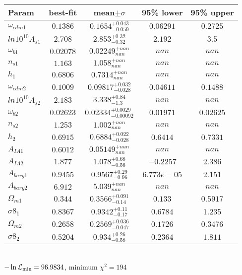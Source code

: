 \begin{tabular}{|l|c|c|c|c|} 
 \hline 
Param & best-fit & mean$\pm\sigma$ & 95\% lower & 95\% upper \\ \hline 
$\omega_{cdm 1 }$ &$0.1386$ & $0.1654_{-0.059}^{+0.043}$ & $0.06291$ & $0.2725$ \\ 
$ln10^{10}A_{s 1 }$ &$2.708$ & $2.853_{-0.32}^{+0.32}$ & $2.192$ & $3.5$ \\ 
$\omega_{b 1 }$ &$0.02078$ & $0.02249_{nan}^{+nan}$ & $nan$ & $nan$ \\ 
$n_{s 1 }$ &$1.163$ & $1.058_{nan}^{+nan}$ & $nan$ & $nan$ \\ 
$h_{1 }$ &$0.6806$ & $0.7314_{nan}^{+nan}$ & $nan$ & $nan$ \\ 
$\omega_{cdm 2 }$ &$0.1009$ & $0.09817_{-0.028}^{+0.032}$ & $0.04611$ & $0.1488$ \\ 
$ln10^{10}A_{s 2 }$ &$2.183$ & $3.338_{-1.3}^{+0.84}$ & $nan$ & $nan$ \\ 
$\omega_{b 2 }$ &$0.02623$ & $0.02334_{-0.00092}^{+0.0029}$ & $0.01971$ & $0.02625$ \\ 
$n_{s 2 }$ &$1.253$ & $1.002_{nan}^{+nan}$ & $nan$ & $nan$ \\ 
$h_{2 }$ &$0.6915$ & $0.6884_{-0.028}^{+0.022}$ & $0.6414$ & $0.7331$ \\ 
$A_{IA 1 }$ &$0.6012$ & $0.05149_{nan}^{+nan}$ & $nan$ & $nan$ \\ 
$A_{IA 2 }$ &$1.877$ & $1.078_{-0.56}^{+0.68}$ & $-0.2257$ & $2.386$ \\ 
$A_{bary 1 }$ &$0.9455$ & $0.9567_{-0.96}^{+0.29}$ & $6.773e-05$ & $2.151$ \\ 
$A_{bary 2 }$ &$6.912$ & $5.039_{nan}^{+nan}$ & $nan$ & $nan$ \\ 
$\Omega_{m 1 }$ &$0.344$ & $0.3566_{-0.14}^{+0.091}$ & $0.133$ & $0.5917$ \\ 
$\sigma8_{1 }$ &$0.8367$ & $0.9342_{-0.17}^{+0.11}$ & $0.6784$ & $1.235$ \\ 
$\Omega_{m 2 }$ &$0.2658$ & $0.2569_{-0.047}^{+0.036}$ & $0.1726$ & $0.3476$ \\ 
$\sigma8_{2 }$ &$0.5204$ & $0.934_{-0.58}^{+0.26}$ & $0.2364$ & $1.811$ \\ 
\hline 
 \end{tabular} \\ 
$-\ln{\cal L}_\mathrm{min} =96.9834$, minimum $\chi^2=194$ \\ 
